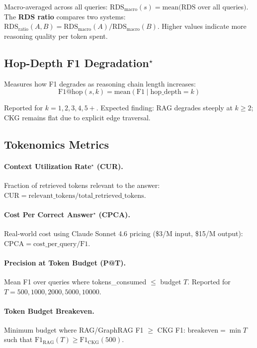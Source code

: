 Macro-averaged across all queries:
$\text{RDS}_{\text{macro}}(s) = \text{mean}(\text{RDS}$ over all queries$)$.
The \textbf{RDS ratio} compares two systems:
$\text{RDS}_{\text{ratio}}(A, B) = \text{RDS}_{\text{macro}}(A) / \text{RDS}_{\text{macro}}(B)$.
Higher values indicate more reasoning quality per token spent.

\subsection{Hop-Depth F1 Degradation$^\star$}\label{sec:metrics-hop}

Measures how F1 degrades as reasoning chain length increases:
\begin{equation}
  \text{F1@hop}(s, k) = \text{mean}(\text{F1} \mid \text{hop\_depth} = k)
\end{equation}

Reported for $k = 1, 2, 3, 4, 5{+}$. Expected finding: RAG degrades steeply at
$k \geq 2$; CKG remains flat due to explicit edge traversal.

\subsection{Tokenomics Metrics}\label{sec:metrics-token}

\paragraph{Context Utilization Rate$^\star$ (CUR).}
Fraction of retrieved tokens relevant to the answer:
$\text{CUR} = \text{relevant\_tokens} / \text{total\_retrieved\_tokens}$.

\paragraph{Cost Per Correct Answer$^\star$ (CPCA).}
Real-world cost using Claude Sonnet 4.6 pricing (\$3/M input, \$15/M output):
$\text{CPCA} = \text{cost\_per\_query} / \text{F1}$.

\paragraph{Precision at Token Budget (P@T).}
Mean F1 over queries where tokens\_consumed $\leq$ budget $T$.
Reported for $T = 500, 1000, 2000, 5000, 10000$.

\paragraph{Token Budget Breakeven.}
Minimum budget where RAG/GraphRAG F1 $\geq$ CKG F1:
$\text{breakeven} = \min T$ such that $\text{F1}_{\text{RAG}}(T) \geq \text{F1}_{\text{CKG}}(500)$.

